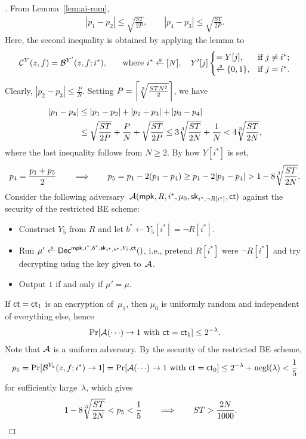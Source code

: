\begin{proof}[]
From Lemma~\ref{lem:ai-rom},
\begin{align*}
|p_1-p_2|\leq\sqrt{\frac{ST}{2P}},\qquad
|p_4-p_3|\leq\sqrt{\frac{ST}{2P}}.
\end{align*}
Here, the second inequality is obtained by applying the lemma to
\begin{align*}
\scriptC^Y(z,f)=\scriptB^{Y'}(z,f;i^\ast)\textup{,\qquad where }
i^\ast\draws[N],\quad
Y'[j]\begin{cases}
=Y[j],&\textup{if }j\neq i^\ast;\\
\draws\bit,&\textup{if }j=i^\ast.
\end{cases}
\end{align*}
Clearly, ${|p_2-p_3|\leq\frac{P}{N}}$.
Setting ${P=\left\lceil\sqrt[3]{\frac{STN^2}{2}}\right\rceil}$, we have
\begin{align*}
|p_1-p_4|
&{}\leq
|p_1-p_2|+|p_2-p_3|+|p_3-p_4|
\\&{}\leq
\sqrt{\frac{ST}{2P}}+\frac{P}{N}+\sqrt{\frac{ST}{2P}}
\leq
3\sqrt[3]{\frac{ST}{2N}}+\frac1N
<
4\sqrt[3]{\frac{ST}{2N}},
\end{align*}
where the last inequality follows from ${N\geq 2}$.
By how $Y[i^\ast]$ is set,
\begin{align*}
p_4=\frac{p_1+p_5}{2}
\WideNarrow{}{\!\!}
\qquad\Longrightarrow\qquad
\WideNarrow{}{\!\!}
p_5
=p_1-2(p_1-p_4)
\geq p_1-2|p_1-p_4|
>1-8\cbrt{\frac{ST}{2N}}.
\end{align*}
Consider the following adversary~$\scriptA(\mpk,R,i^\ast,\mu_0,\sk_{i^\ast,\neg R[i^\ast]},\ct)$ against the security of the restricted BE scheme:
\begin{itemize}
\item Construct $Y_5$ from $R$ and
let ${b^\ast\gets Y_5[i^\ast]=\neg R[i^\ast]}$.
\item Run ${\mu'\draws\Dec^{\mpk,i^\ast,b^\ast,\sk_{i^\ast,b^\ast},Y_5,\ct}()}$,
i.e., pretend $R[i^\ast]$ were $\neg R[i^\ast]$ and try decrypting using the key given to~${\mathcal{A}}$.
\item Output $1$ if and only if ${\mu'=\mu}$.
\end{itemize}
If ${\ct=\ct_1}$ is an encryption of~$\mu_1$, then $\mu_0$ is uniformly random and independent of everything else, hence
\begin{align*}
\Pr[\scriptA({\cdots})\to 1\textup{ with }\ct=\ct_1]\leq 2^{-\lambda}.
\end{align*}
Note that ${\mathcal{A}}$ is a uniform adversary.
By the security of the restricted BE scheme,
\begin{align*}
p_5
=\Pr[\scriptB^{Y_5}(z,f;i^\ast)\to 1]
=\Pr[\scriptA({\cdots})\to 1\textup{ with }\ct=\ct_0]
\leq 2^{-\lambda}+\negl(\lambda)
<\frac15
\end{align*}
for sufficiently large~$\lambda$, which gives
\begin{align*}
1-8\sqrt[3]{\frac{ST}{2N}}<p_5<\frac15
&
\qquad\Longrightarrow\qquad
ST>\frac{2N}{1000}.
\qedhere
\end{align*}
\end{proof}
